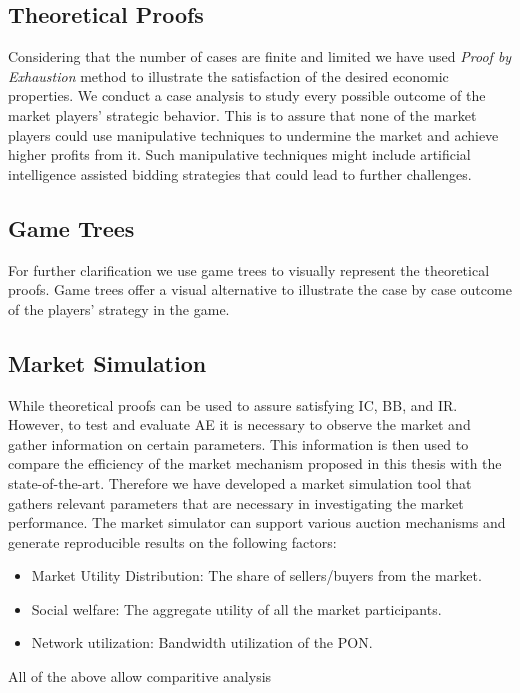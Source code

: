 \subsection{Theoretical Proofs}

Considering that the number of cases are finite and limited we have used \textit{Proof by Exhaustion} method to illustrate the satisfaction of the desired economic properties. We conduct a case analysis to study every possible outcome of the market players' strategic behavior. This is to assure that none of the market players could use manipulative techniques to undermine the market and achieve higher profits from it. Such manipulative techniques might include artificial intelligence assisted bidding strategies that could lead to further challenges. 

\subsection{Game Trees}
For further clarification we use game trees to visually represent the theoretical proofs. Game trees offer a visual alternative to illustrate the case by case outcome of the players' strategy in the game. 
\subsection{Market Simulation}
While theoretical proofs can be used to assure satisfying \ac{IC}, \ac{BB}, and \ac{IR}. However, to test and evaluate \acl{AE} it is necessary to observe the market and gather information on certain parameters. This information is then used to compare the efficiency of the market mechanism proposed in this thesis with the state-of-the-art.
Therefore we have developed a market simulation tool that gathers relevant parameters that are necessary in investigating the market performance. The market simulator can support various auction mechanisms and generate reproducible results on the following factors:
\begin{itemize}
    \item Market Utility Distribution: The share of sellers/buyers from the market.
    \item Social welfare: The aggregate utility of all the market participants.
    \item Network utilization: Bandwidth utilization of the \ac{PON}.
\end{itemize}

All of the above 
allow comparitive analysis

